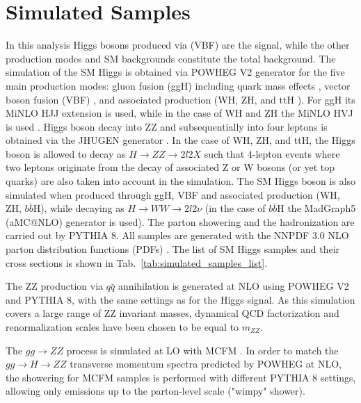 \section{Simulated Samples}
In this analysis Higgs bosons produced via (VBF) are the signal, while the other production modes and SM backgrounds constitute the total background. The simulation of the SM Higgs is obtained via POWHEG V2 \cite{bib:JHEP_07_2008_060,bib:JHEP_11_2007_070} generator for the five main production modes: gluon fusion (ggH) including quark mass effects \cite{bib:JHEP_02_2012_088}, vector boson fusion (VBF) \cite{bib:JHEP_02_2010_037}, and associated production (WH, ZH, and ttH \cite{bib:PhysRev_D91_2015_9_094003}). For ggH its MiNLO HJJ extension is used, while in the case of WH and ZH the MiNLO HVJ is used \cite{bib:JHEP_10_2013_083}. Higgs boson decay into ZZ and subsequentially into four leptons is obtained via the JHUGEN generator \cite{bib:PhysRev_D81_2010_075022}. In the case of WH, ZH, and ttH, the Higgs boson is allowed to decay as $H \rightarrow ZZ \rightarrow 2l2X$ such that 4-lepton events where two leptons originate from the decay of associated Z or W bosons (or yet top quarks) are also taken into account in the simulation. The SM Higgs boson is also simulated when produced through ggH, VBF and associated production (WH, ZH, $b\bar{b}$H), while decaying as $H \rightarrow WW \rightarrow 2l2\nu$ (in the case of $b\bar{b}$H the MadGraph5 (aMC@NLO) generator is used). The parton showering and the hadronization are carried out by PYTHIA 8. All samples are generated with the NNPDF 3.0 NLO parton distribution functions (PDFs) \cite{bib:JHEP_04_2015_040}. The list of SM Higgs samples and their cross sections is shown in Tab.~\ref{tab:simulated_samples_list}.

The ZZ production via $q\bar{q}$ annihilation is generated at NLO using POWHEG V2 \cite{bib:EurPhysJ_C74_2014_1_2702} and PYTHIA 8, with the same settings as for the Higgs signal. As this simulation covers a large range of ZZ invariant masses, dynamical QCD factorization and renormalization scales have been chosen to be equal to $m_{ZZ}$.

The $gg \rightarrow ZZ$ process is simulated at LO with MCFM \cite{bib:NuclPhysProcSuppl_205_2010_10, bib:JHEP_04_2014_060}. In order to match the $gg \rightarrow H \rightarrow ZZ$ transverse momentum spectra predicted by POWHEG at NLO, the showering for MCFM samples is performed with different PYTHIA 8 settings, allowing only emissions up to the parton-level scale ("wimpy" shower).

